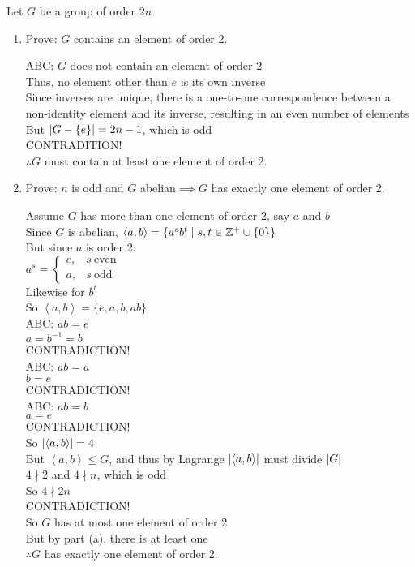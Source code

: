\documentclass[letterpaper,12pt,fleqn]{article}
\newcommand{\cycle}[1]{\left<#1\right>}
\begin{document}
Let $G$ be a group of order $2n$
\begin{enumerate}[label={\alph*)}]
\item Prove: $G$ contains an element of order 2.

  ABC: $G$ does not contain an element of order 2 \\
  Thus, no element other than $e$ is its own inverse \\
  Since inverses are unique, there is a one-to-one correspondence between a
  non-identity element and its inverse, resulting in an even number of
  elements \\
  But $\lvert G-\{e\}\rvert=2n-1$, which is odd \\
  CONTRADITION! \\
  $\therefore G$ must contain at least one element of order 2.

\item Prove: $n$ is odd and $G$ abelian$\implies G$ has exactly one element of
  order 2.

  Assume $G$ has more than one element of order 2, say $a$ and $b$ \\
  Since $G$ is abelian, $\cycle{a,b}=\{a^sb^t\mid s,t\in\Z^+\cup\{0\}\}$ \\
  But since $a$ is order 2:\\
  $a^s=\begin{cases}e, & s\ \mbox{even} \\ a, & s\ \mbox{odd}\end{cases}$ \\
  Likewise for $b^t$ \\
  So $\cycle{a,b}=\{e,a,b,ab\}$ \\
  ABC: $ab=e$ \\
  $a=b^{-1}=b$ \\
  CONTRADICTION! \\
  ABC: $ab=a$ \\
  $b=e$ \\
  CONTRADICTION! \\
  ABC: $ab=b$ \\
  $a=e$ \\
  CONTRADICTION! \\
  So $\abs{\cycle{a,b}}=4$ \\
  But $\cycle{a,b}\le G$, and thus by Lagrange $\abs{\cycle{a,b}}$ must
  divide $\lvert G\rvert$ \\
  $4\nmid2$ and $4\nmid n$, which is odd \\
  So $4\nmid2n$ \\
  CONTRADICTION! \\
  So $G$ has at most one element of order 2 \\
  But by part (a), there is at least one \\
  $\therefore G$ has exactly one element of order 2.
\end{enumerate}
\end{document}
